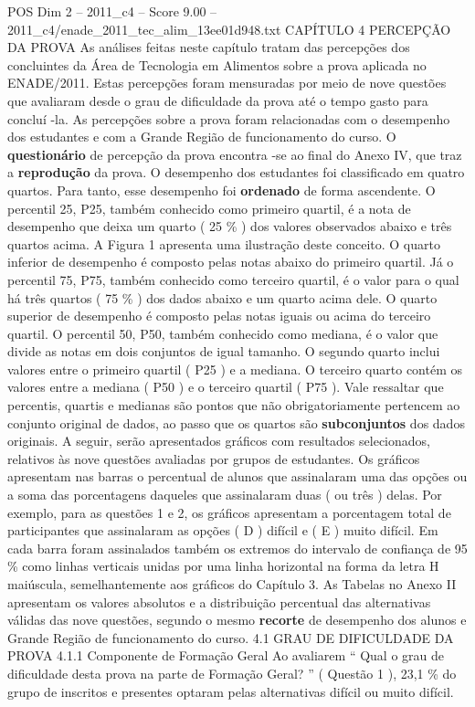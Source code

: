 \begin{textsample}{POS Dim 2 – 2011\_c4 – Score 9.00 – 2011\_c4/enade\_2011\_tec\_alim\_13ee01d948.txt}  \label{ex:f2_pos_123}
CAPÍTULO 4 PERCEPÇÃO DA PROVA As análises feitas neste capítulo tratam das percepções dos concluintes da Área de Tecnologia em Alimentos sobre a prova aplicada no ENADE/2011.
Estas percepções foram mensuradas por meio de nove questões que avaliaram desde o grau de dificuldade da prova até o tempo gasto para concluí -la.
As percepções sobre a prova foram relacionadas com o desempenho dos estudantes e com a Grande Região de funcionamento do curso.
O \textbf{questionário} de percepção da prova encontra -se ao final do Anexo IV, que traz a \textbf{reprodução} da prova.
O desempenho dos estudantes foi classificado em quatro quartos.
Para tanto, esse desempenho foi \textbf{ordenado} de forma ascendente.
O percentil 25, P25, também conhecido como primeiro quartil, é a nota de desempenho que deixa um quarto ( 25 \% ) dos valores observados abaixo e três quartos acima.
A Figura 1 apresenta uma ilustração deste conceito.
O quarto inferior de desempenho é composto pelas notas abaixo do primeiro quartil.
Já o percentil 75, P75, também conhecido como terceiro quartil, é o valor para o qual há três quartos ( 75 \% ) dos dados abaixo e um quarto acima dele.
O quarto superior de desempenho é composto pelas notas iguais ou acima do terceiro quartil.
O percentil 50, P50, também conhecido como mediana, é o valor que divide as notas em dois conjuntos de igual tamanho.
O segundo quarto inclui valores entre o primeiro quartil ( P25 ) e a mediana.
O terceiro quarto contém os valores entre a mediana ( P50 ) e o terceiro quartil ( P75 ).
Vale ressaltar que percentis, quartis e medianas são pontos que não obrigatoriamente pertencem ao conjunto original de dados, ao passo que os quartos são \textbf{subconjuntos} dos dados originais.
A seguir, serão apresentados gráficos com resultados selecionados, relativos às nove questões avaliadas por grupos de estudantes.
Os gráficos apresentam nas barras o percentual de alunos que assinalaram uma das opções ou a soma das porcentagens daqueles que assinalaram duas ( ou três ) delas.
Por exemplo, para as questões 1 e 2, os gráficos apresentam a porcentagem total de participantes que assinalaram as opções ( D ) difícil e ( E ) muito difícil.
Em cada barra foram assinalados também os extremos do intervalo de confiança de 95 \% como linhas verticais unidas por uma linha horizontal na forma da letra H maiúscula, semelhantemente aos gráficos do Capítulo 3.
As Tabelas no Anexo II apresentam os valores absolutos e a distribuição percentual das alternativas válidas das nove questões, segundo o mesmo \textbf{recorte} de desempenho dos alunos e Grande Região de funcionamento do curso. 4.1 GRAU DE DIFICULDADE DA PROVA 4.1.1 Componente de Formação Geral Ao avaliarem “ Qual o grau de dificuldade desta prova na parte de Formação Geral? ” ( Questão 1 ), 23,1 \% do grupo de inscritos e presentes optaram pelas alternativas difícil ou muito difícil.

\end{textsample}
